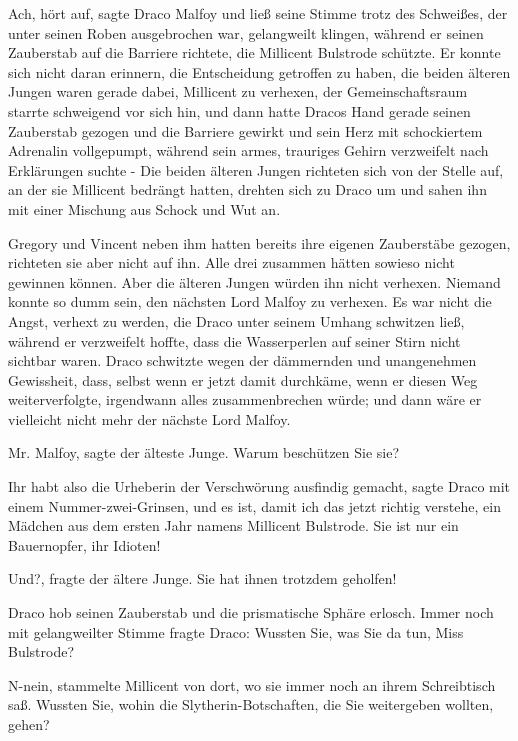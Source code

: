 \glqq Ach, hört auf\grqq{}, sagte Draco Malfoy und ließ seine Stimme trotz des
Schweißes, der unter seinen Roben ausgebrochen war, gelangweilt klingen, während
er seinen Zauberstab auf die Barriere richtete, die Millicent Bulstrode
schützte. Er konnte sich nicht daran erinnern, die Entscheidung getroffen zu
haben, die beiden älteren Jungen waren gerade dabei, Millicent zu verhexen, der
Gemeinschaftsraum starrte schweigend vor sich hin, und dann hatte Dracos Hand
gerade seinen Zauberstab gezogen und die Barriere gewirkt und sein Herz mit
schockiertem Adrenalin vollgepumpt, während sein armes, trauriges Gehirn
verzweifelt nach Erklärungen suchte - Die beiden älteren Jungen richteten sich
von der Stelle auf, an der sie Millicent bedrängt hatten, drehten sich zu Draco
um und sahen ihn mit einer Mischung aus Schock und Wut an.

Gregory und Vincent neben ihm hatten bereits ihre eigenen Zauberstäbe gezogen,
richteten sie aber nicht auf ihn. Alle drei zusammen hätten sowieso nicht
gewinnen können. Aber die älteren Jungen würden ihn nicht verhexen. Niemand
konnte so dumm sein, den nächsten Lord Malfoy zu verhexen. Es war nicht die
Angst, verhext zu werden, die Draco unter seinem Umhang schwitzen ließ, während
er verzweifelt hoffte, dass die Wasserperlen auf seiner Stirn nicht sichtbar
waren. Draco schwitzte wegen der dämmernden und unangenehmen Gewissheit, dass,
selbst wenn er jetzt damit durchkäme, wenn er diesen Weg weiterverfolgte,
irgendwann alles zusammenbrechen würde; und dann wäre er vielleicht nicht mehr
der nächste Lord Malfoy.

\glqq Mr. Malfoy\grqq{}, sagte der älteste Junge. \glqq Warum beschützen Sie
sie?\grqq{}

\glqq Ihr habt also die Urheberin der Verschwörung ausfindig gemacht\grqq{},
sagte Draco mit einem Nummer-zwei-Grinsen, \glqq und es ist, damit ich das jetzt
richtig verstehe, ein Mädchen aus dem ersten Jahr namens Millicent Bulstrode.
Sie ist nur ein Bauernopfer, ihr Idioten!\grqq{}

\glqq Und?\grqq{}, fragte der ältere Junge. \glqq Sie hat ihnen trotzdem
geholfen!\grqq{}

Draco hob seinen Zauberstab und die prismatische Sphäre erlosch. Immer noch mit
gelangweilter Stimme fragte Draco: \glqq Wussten Sie, was Sie da tun, Miss
Bulstrode?\grqq{}

\glqq N-nein\grqq{}, stammelte Millicent von dort, wo sie immer noch an ihrem
Schreibtisch saß. \glqq Wussten Sie, wohin die Slytherin-Botschaften, die Sie
weitergeben wollten, gehen?\grqq{}

